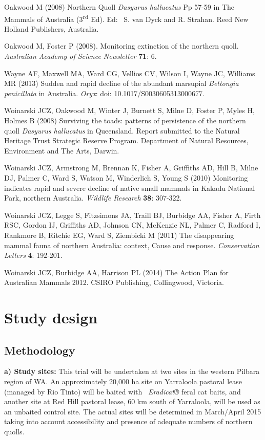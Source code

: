 \documentclass[version=last,
    paper=a4,                               %
    10pt,                                   %
    dvipsnames,
    oneside,                              %
    headings=openany,                       %
    open=any,
    BCOR=7mm,                               %
    DIV=15,     %
]{scrbook}
\begin{document}
Oakwood M (2008) Northern Quoll \emph{Dasyurus hallucatus} Pp 57-59 in
The Mammals of Australia (3\textsuperscript{rd} Ed). Ed:~ S. van Dyck
and R. Strahan. Reed New Holland Publishers, Australia.

Oakwood M, Foster P (2008). Monitoring extinction of the northern quoll.
\emph{Australian Academy of Science Newsletter} \textbf{71}: 6.

Wayne AF, Maxwell MA, Ward CG, Vellios CV, Wilson I, Wayne JC, Williams
MR (2013) Sudden and rapid decline of the abundant marsupial
\emph{Bettongia penicillata} in Australia. \emph{Oryx}: doi:
10.1017/S0030605313000677.

Woinarski JCZ, Oakwood M, Winter J, Burnett S, Milne D, Foster P, Myles
H, Holmes B (2008) Surviving the toads: patterns of persistence of the
northern quoll \emph{Dasyurus hallucatus} in Queensland. Report
submitted to the Natural Heritage Trust Strategic Reserve Program.
Department of Natural Resources, Environment and The Arts, Darwin.

Woinarski JCZ, Armstrong M, Brennan K, Fisher A, Griffiths AD, Hill B,
Milne DJ, Palmer C, Ward S, Watson M, Winderlich S, Young S (2010)
Monitoring indicates rapid and severe decline of native small mammals in
Kakadu National Park, northern Australia. \emph{Wildlife Research}
\textbf{38}: 307-322.

Woinarski JCZ, Legge S, Fitzsimons JA, Traill BJ, Burbidge AA, Fisher A,
Firth RSC, Gordon IJ, Griffiths AD, Johnson CN, McKenzie NL, Palmer C,
Radford I, Rankmore B, Ritchie EG, Ward S, Ziembicki M (2011) The
disappearing mammal fauna of northern Australia: context, Cause and
response. \emph{Conservation Letters} \textbf{4}: 192-201.

Woinarski JCZ, Burbidge AA, Harrison PL (2014) The Action Plan for
Australian Mammals 2012. CSIRO Publishing, Collingwood, Victoria.



\section*{Study design}


\subsection*{Methodology}

\textbf{a) Study sites:} This trial will be undertaken at two sites in
the western Pilbara region of WA. An approximately 20,000 ha site on
Yarraloola pastoral lease (managed by Rio Tinto) will be baited with~
\emph{Eradicat®} feral cat baits, and another site at Red Hill pastoral
lease, 60 km south of Yarraloola, will be used as an unbaited control
site. The actual sites will be determined in March/April 2015 taking
into account accessibility and presence of adequate numbers of northern
quolls.
\end{document}
